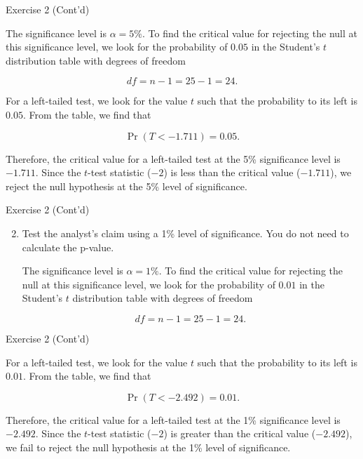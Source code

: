 \documentclass[
  ignorenonframetext,
  aspectratio=43,
]{beamer}
\let\olditem\item
\renewcommand\item{\olditem\justifying}
\begin{document}
\begin{frame}{Exercise 2 (Cont'd)}
\protect\hypertarget{exercise-2-contd-1}{}
\pause

The significance level is \(\alpha = 5\%\). To find the critical value
for rejecting the null at this significance level, we look for the
probability of \(0.05\) in the Student's \(t\) distribution table with
degrees of freedom \vspace{-4pt}

\pause

\[
df = n - 1 = 25 - 1 = 24.
\]

\pause

For a left-tailed test, we look for the value \(t\) such that the
probability to its left is \(0.05\). From the table, we find that
\vspace{-4pt}

\pause

\[
\Pr(T < -1.711) = 0.05.
\]

\pause

Therefore, the critical value for a left-tailed test at the 5\%
significance level is \(-1.711\). Since the \(t\)-test statistic
(\(-2\)) is less than the critical value (\(-1.711\)), we reject the
null hypothesis at the 5\% level of significance.
\end{frame}

\begin{frame}{Exercise 2 (Cont'd)}
\protect\hypertarget{exercise-2-contd-2}{}
\begin{enumerate}
\setcounter{enumi}{1}
\item
  Test the analyst's claim using a 1\% level of significance. You do not
  need to calculate the p-value.

  \pause

  The significance level is \(\alpha = 1\%\). To find the critical value
  for rejecting the null at this significance level, we look for the
  probability of \(0.01\) in the Student's \(t\) distribution table with
  degrees of freedom \vspace{-4pt}

  \pause

  \[
   df = n - 1 = 25 - 1 = 24.
   \]
\end{enumerate}
\end{frame}

\begin{frame}{Exercise 2 (Cont'd)}
\protect\hypertarget{exercise-2-contd-3}{}
\pause

For a left-tailed test, we look for the value \(t\) such that the
probability to its left is \(0.01\). From the table, we find that
\vspace{-4pt}

\pause

\[
\Pr(T < -2.492) = 0.01.
\]

\pause

Therefore, the critical value for a left-tailed test at the 1\%
significance level is \(-2.492\). Since the \(t\)-test statistic
(\(-2\)) is greater than the critical value (\(-2.492\)), we fail to
reject the null hypothesis at the 1\% level of significance.
\end{frame}
\end{document}
